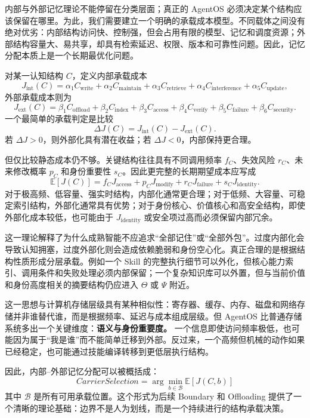 内部与外部记忆理论不能停留在分类层面；真正的 AgentOS 必须决定某个结构应该保留在哪里。为此，我们需要建立一个明确的承载成本模型。不同载体之间没有绝对优劣：内部结构访问快、控制强，但会占用有限的模型、记忆和调度资源；外部结构容量大、易共享，却具有检索延迟、权限、版本和可靠性问题。因此，记忆分配本质上是一个长期最优化问题。

对某一认知结构 \(C\)，定义内部承载成本
\[
J_{\mathrm{int}}(C)
=
\alpha_1 C_{\mathrm{write}}
+
\alpha_2 C_{\mathrm{maintain}}
+
\alpha_3 C_{\mathrm{retrieve}}
+
\alpha_4 C_{\mathrm{interference}}
+
\alpha_5 C_{\mathrm{update}},
\]
外部承载成本则为
\[
J_{\mathrm{ext}}(C)
=
\beta_1 C_{\mathrm{offload}}
+
\beta_2 C_{\mathrm{index}}
+
\beta_3 C_{\mathrm{access}}
+
\beta_4 C_{\mathrm{verify}}
+
\beta_5 C_{\mathrm{failure}}
+
\beta_6 C_{\mathrm{security}}.
\]
一个最简单的承载判定是比较
\[
\Delta J(C)
=
J_{\mathrm{int}}(C)-J_{\mathrm{ext}}(C).
\]
若 \(\Delta J>0\)，则外部化具有潜在收益；若 \(\Delta J<0\)，内部保持更合理。

但仅比较静态成本仍不够。关键结构往往具有不同调用频率 \(f_C\)、失效风险 \(r_C\)、未来修改概率 \(p_C\) 和身份重要性 \(s_C\)。因此更完整的长期期望成本应写成
\[
\mathbb E[J(C)]
=
f_C J_{\mathrm{access}}
+
p_C J_{\mathrm{modify}}
+
r_C J_{\mathrm{failure}}
+
s_C J_{\mathrm{identity}}.
\]
对于极高频、低容量、强实时结构，内部化通常更合理；对于低频、大容量、可稳定索引结构，外部化通常具有优势；对于身份核心、价值核心和高安全结构，即使外部化成本较低，也可能由于 \(J_{\mathrm{identity}}\) 或安全项过高而必须保留内部冗余。

这一理论解释了为什么成熟智能不应追求``全部记住''或``全部外包''。过度内部化会导致认知拥塞，过度外部化则会造成依赖脆弱和身份空心化。真正合理的是根据结构性质形成分层承载。例如一个 Skill 的完整执行细节可以外化，但核心能力索引、调用条件和失败处理必须内部保留；一个复杂知识库可以外置，但与当前价值和身份高度相关的摘要结构仍应进入 \(\Theta\) 或 \(\Psi\) 附近。

这一思想与计算机存储层级具有某种相似性：寄存器、缓存、内存、磁盘和网络存储并非谁替代谁，而是根据频率、延迟与成本组成层级。但 AgentOS 比普通存储系统多出一个关键维度：\textbf{语义与身份重要度。} 一个信息即使访问频率极低，也可能因为属于``我是谁''而不能简单迁移到外部。反过来，一个高频但机械的动作如果已经稳定，也可能通过技能编译转移到更低层执行结构。

因此，内部--外部记忆分配可以被概括成：
\[
\boxed{
CarrierSelection
=
\arg\min_{b\in\mathcal B}
\mathbb E[J(C,b)]
}
\]
其中 \(\mathcal B\) 是所有可用承载位置。这个形式为后续 Boundary 和 Offloading 提供了一个清晰的理论基础：边界不是人为划线，而是一个持续进行的结构承载决策。

